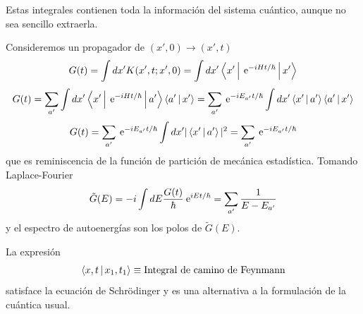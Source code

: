 \documentclass[10pt,oneside]{CBFT_book}
\begin{document}
Estas integrales contienen toda la información del sistema cuántico, aunque no sea sencillo extraerla.

Consideremos un propagador de $(x',0) \to (x',t)$
\[
	G(t) = \int dx' K(x',t ; x', 0) = \int dx' \Braket{x'|\:\mathrm{e}^{-i Ht/\hbar}|x'}
\]
\[
	G(t) = \sum_{a'} \int dx' \Braket{x'|\:\mathrm{e}^{-i Ht/\hbar}|a'}\Braket{a'|x'} =
		\sum_{a'} \:\mathrm{e}^{-i E_{a'}t/\hbar} \int dx' \Braket{x'|a'}\Braket{a'|x' }
\]
\[
	G(t) = \sum_{a'} \:\mathrm{e}^{-i E_{a'}t/\hbar} \int dx' |\Braket{x'|a'}|^2 = \sum_{a'} \:\mathrm{e}^{-i E_{a'}t/\hbar} 
\]
que es reminiscencia de la función de partición de mecánica estadística. Tomando Laplace-Fourier 
\[
	\tilde{G}(E) = -i \int dE \frac{G(t)}{\hbar} \:\mathrm{e}^{i E t/\hbar} = \sum_{a'} \frac{1}{E-E_{a'}}
\]
y el espectro de autoenergías son los polos de $\tilde{G}(E)$.

La expresión 
\[
	\Braket{x,t|x_1,t_1} \equiv \text{Integral de camino de Feynmann}
\]
satisface la ecuación de Schrödinger y es una alternativa a la formulación de la cuántica usual.


\end{document}
